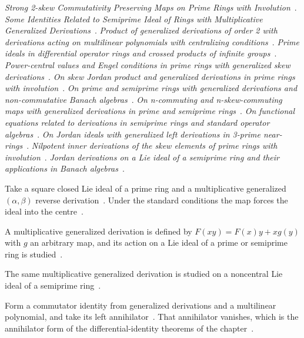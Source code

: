 \noindent\emph{Strong 2-skew Commutativity Preserving Maps on Prime Rings with
Involution}~\cite{LibStrongSkewCommutativityPreserving2019}.
\noindent\emph{Some Identities Related to Semiprime Ideal of Rings with
Multiplicative Generalized Derivations}~\cite{LibSomeIdentitiesRelatedTo2024}.
\noindent\emph{Product of generalized derivations of order 2 with derivations
acting on multilinear polynomials with centralizing
conditions}~\cite{LibProductOfGeneralizedDerivations2024}.
\noindent\emph{Prime ideals in differential operator rings and crossed
products of infinite groups}~\cite{LibPrimeIdealsInDifferential1987}.
\noindent\emph{Power-central values and Engel conditions in prime rings with
generalized skew derivations}~\cite{LibPowerCentralValuesAnd2021}.
\noindent\emph{On skew Jordan product and generalized derivations in prime
rings with involution}~\cite{LibOnSkewJordanProduct2024}. \noindent\emph{On
prime and semiprime rings with generalized derivations and non-commutative
Banach algebras}~\cite{LibOnPrimeAndSemiprime2016}. \noindent\emph{On
n-commuting and n-skew-commuting maps with generalized derivations in prime
and semiprime rings}~\cite{LibOnNCommutingAnd2011}. \noindent\emph{On
functional equations related to derivations in semiprime rings and standard
operator algebras}~\cite{LibOnFunctionalEquationsRelated2012}.
\noindent\emph{On Jordan ideals with generalized left derivations in 3-prime
near-rings}~\cite{LibOnJordanIdealsWith2023}. \noindent\emph{Nilpotent inner
derivations of the skew elements of prime rings with
involution}~\cite{LibNilpotentInnerDerivationsOf1991}. \noindent\emph{Jordan
derivations on a Lie ideal of a semiprime ring and their applications in
Banach algebras}~\cite{LibJordanDerivationsOnA2016}.

Take a square closed Lie ideal of a prime ring and a multiplicative generalized
$(\alpha,\beta)$ reverse derivation~\cite{WlSquareClosedLie2021}. Under the standard conditions the map
forces the ideal into the centre~\cite{WlSquareClosedLie2021}.

A multiplicative generalized derivation is defined by $F(xy)=F(x)y+xg(y)$ with
$g$ an arbitrary map, and its action on a Lie ideal of a prime or semiprime
ring is studied~\cite{WlOnLieIdeals2015}.

The same multiplicative generalized derivation is studied on a noncentral Lie
ideal of a semiprime ring~\cite{WlMultiplicativeGeneralizedD2017}.

Form a commutator identity from generalized derivations and a multilinear
polynomial, and take its left annihilator~\cite{WlLeftAnnihilatorOf2016}. That annihilator vanishes, which is
the annihilator form of the differential-identity theorems of the
chapter~\cite{WlLeftAnnihilatorOf2016}.

